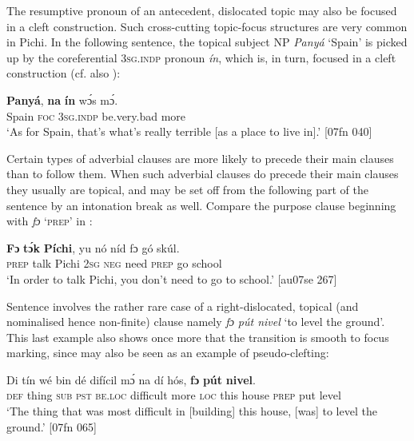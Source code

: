 The resumptive pronoun of an antecedent, dislocated topic may also be focused in a cleft construction. Such cross-cutting topic-focus structures are very common in Pichi. In the following sentence, the topical subject \textsc{NP} \textit{Panyá} ‘Spain’ is picked up by the coreferential \textsc{3sg.indp} pronoun \textit{ín}, which is, in turn, focused in a cleft construction (cf. also ):


\ea%
    \label{ex:key:753}
    \gll \textbf{Panyá},  \textbf{na}  \textbf{ín}    wɔ́s      mɔ́.\\
Spain  \textsc{foc}  \textsc{3sg.indp}  be.very.bad  more\\

\glt ‘As for Spain, that’s what’s really terrible [as a place to live in].’ [07fn 040]
\z

Certain types of adverbial clauses are more likely to precede their main clauses than to follow them. When such adverbial clauses do precede their main clauses they usually are topical, and may be set off from the following part of the sentence by an intonation break as well. Compare the purpose clause beginning with \textit{fɔ} ‘\textsc{prep’} in :


\ea%
    \label{ex:key:754}
    \gll \textbf{Fɔ}  \textbf{tɔ́k}  \textbf{Píchi},  yu  nó  níd    fɔ  gó  skúl.\\
\textsc{prep}  talk  Pichi  \textsc{2sg}  \textsc{neg}  need  \textsc{prep}  go  school\\

\glt ‘In order to talk Pichi, you don’t need to go to school.’ [au07se 267]
\z

Sentence  involves the rather rare case of a right-dislocated, topical (and nominalised hence non-finite) clause namely \textit{fɔ pút nivel} ‘to level the ground’. This last example also shows once more that the transition is smooth to focus marking, since  may also be seen as an example of pseudo-clefting: 


\ea%
    \label{ex:key:755}
    \gll Di  tín    wé  bin  dé    difícil  mɔ́    na  dí  hós,  
\textbf{fɔ}  \textbf{pút}  \textbf{nivel}. \\
\textsc{def}  thing  \textsc{sub}  \textsc{pst}  \textsc{be.loc}  difficult  more  \textsc{loc}  this  house
\textsc{prep}  put  level\\
\glt ‘The thing that was most difficult in [building] this house, [was]
to level the ground.’ [07fn 065]
\z

